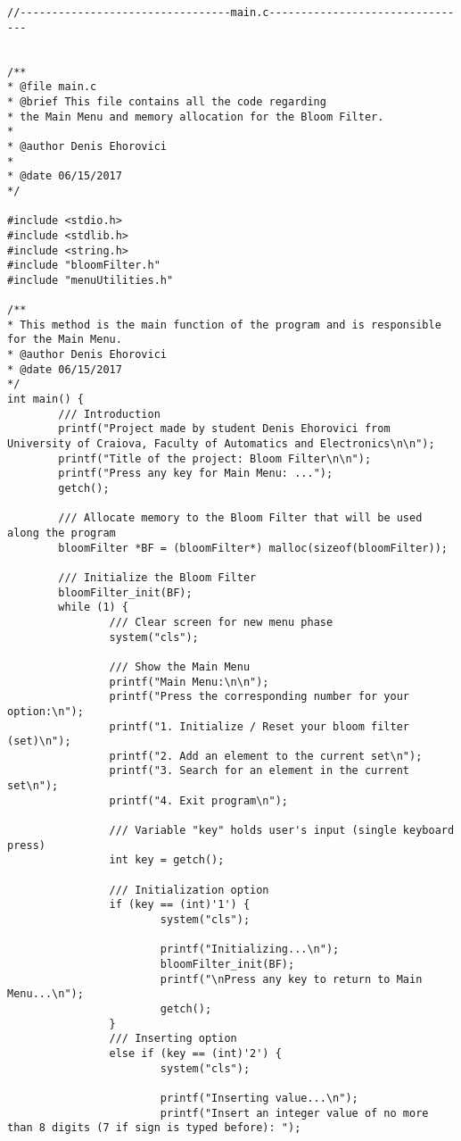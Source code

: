 \documentclass[14pt]{article}
\begin{document}
\begin{lstlisting}
//---------------------------------main.c--------------------------------


/**
* @file main.c
* @brief This file contains all the code regarding
* the Main Menu and memory allocation for the Bloom Filter.
*
* @author Denis Ehorovici
*
* @date 06/15/2017
*/

#include <stdio.h>
#include <stdlib.h>
#include <string.h>
#include "bloomFilter.h"
#include "menuUtilities.h"

/**
* This method is the main function of the program and is responsible for the Main Menu.
* @author Denis Ehorovici
* @date 06/15/2017
*/
int main() {
        /// Introduction
        printf("Project made by student Denis Ehorovici from University of Craiova, Faculty of Automatics and Electronics\n\n");
        printf("Title of the project: Bloom Filter\n\n");
        printf("Press any key for Main Menu: ...");
        getch();

        /// Allocate memory to the Bloom Filter that will be used along the program
        bloomFilter *BF = (bloomFilter*) malloc(sizeof(bloomFilter));

        /// Initialize the Bloom Filter
        bloomFilter_init(BF);
        while (1) {
                /// Clear screen for new menu phase
                system("cls");

                /// Show the Main Menu
                printf("Main Menu:\n\n");
                printf("Press the corresponding number for your option:\n");
                printf("1. Initialize / Reset your bloom filter (set)\n");
                printf("2. Add an element to the current set\n");
                printf("3. Search for an element in the current set\n");
                printf("4. Exit program\n");

                /// Variable "key" holds user's input (single keyboard press)
                int key = getch();

                /// Initialization option
                if (key == (int)'1') {
                        system("cls");

                        printf("Initializing...\n");
                        bloomFilter_init(BF);
                        printf("\nPress any key to return to Main Menu...\n");
                        getch();
                }
                /// Inserting option
                else if (key == (int)'2') {
                        system("cls");

                        printf("Inserting value...\n");
                        printf("Insert an integer value of no more than 8 digits (7 if sign is typed before): ");


\end{lstlisting}
\end{document}

